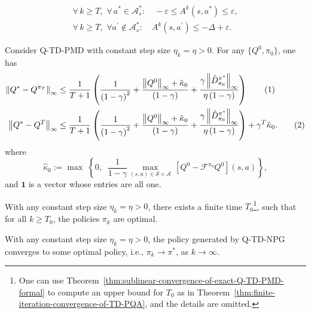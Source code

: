 \documentclass[10pt,a4paper]{amsart}
\newcommand\numberthis{\addtocounter{equation}{1}\tag{\theequation}}
\newcommand{\calA}{\mathcal{A}}
\newcommand{\calF}{\mathcal{F}}
\newcommand{\calS}{\mathcal{S}}
\newcommand{\ls}{\left}
\newcommand{\rs}{\right}
\begin{document}
    \begin{equation}\label{eq:bounds-for-A-k}
    \begin{aligned}
        \forall\, k \geq T,\,\, \forall \, a^*\in\calA^*_s: \quad -\varepsilon \leq  A^k(s,a^*)  \leq \varepsilon, \\
        \forall\, k \geq T , \,\, \forall a^\prime\not\in\calA^*_s: \quad A^k(s,a^\prime) \leq -\Delta + \varepsilon.
    \end{aligned}
    \end{equation}

\begin{theorem}\label{thm:sublinear-convergence-of-exact-Q-TD-PMD-formal}
  Consider Q-TD-PMD with constant step size $\eta_k=\eta>0$. For any $\{Q^0,\pi_0\}$, one has
    \begin{align*}
\left\| Q^*-Q^{\pi _T} \right\| _{\infty}&\le \frac{1}{T+1}\left( \frac{1}{\left( 1-\gamma \right) ^2}+\frac{\left\| Q^0 \right\| _{\infty}+\hat{\kappa}_0}{\left( 1-\gamma \right)}+\frac{\gamma \left\| \hat{D}_{\pi _0}^{\pi ^*} \right\| _{\infty}}{\eta \left( 1-\gamma \right)} \right)  \numberthis\label{eq:sublinear-convergence-of-output-policy-Q-TD-PMD} 
        \\
\left\| Q^*-Q^T \right\| _{\infty}&\le \frac{1}{T+1}\left( \frac{1}{\left( 1-\gamma \right) ^2}+\frac{\left\| Q^0 \right\| _{\infty}+\hat{\kappa}_0}{\left( 1-\gamma \right)}+\frac{\gamma \left\| \hat{D}_{\pi _0}^{\pi ^*} \right\| _{\infty}}{\eta \left( 1-\gamma \right)} \right) +\gamma ^T\hat{\kappa}_0.
        \numberthis \label{eq:sublinear-convergence-of-output-value-Q-TD-PMD}
    \end{align*}
where 
\[\hat{\kappa}_0 :=  \max \; \ls\{0, \;\; \frac{1}{1-\gamma} \max_{(s,a)\in\calS\times\calA} \, [Q^0 - \calF^{\pi_0}Q^0](s,a) \rs\} , \]
and $\mathbf{1}$ is a vector whose entries are all one.
\end{theorem}

\begin{theorem}
    With any constant step size $\eta_k = \eta > 0$, there exists a finite time $T_0$\footnote{One can use Theorem~\ref{thm:sublinear-convergence-of-exact-Q-TD-PMD-formal} to compute an upper bound for $T_0$ as in Theorem~\ref{thm:finite-iteration-convergence-of-TD-PQA}, and the details are omitted.}, such that for all $k \geq T_0$, the policies $\pi_k$ are optimal.
    \label{thm:finite-iteration-convergence-of-Q-TD-PQA}
\end{theorem}

\begin{theorem}
    With any constant step size $\eta_k = \eta > 0$, the policy generated by Q-TD-NPG converges to some optimal policy, i.e., $\pi_k \to \pi^*$, as $k \to \infty$.
    \label{thm:policy-convergence-of-Q-TD-NPG}
\end{theorem}
\end{document}
